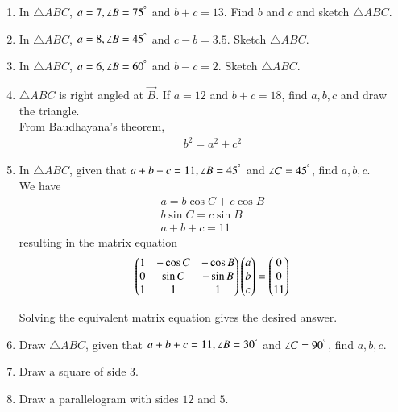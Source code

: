 \documentclass[journal,12pt,twocolumn]{IEEEtran}
\renewcommand\thesection{\arabic{section}}
\begin{document}
\begin{enumerate}[label=\thesection.\arabic*
,ref=\thesection.\theenumi]
\item In $\triangle ABC$,  $a = 7, \angle B = 75^{\degree}$ and $b+c = 13$. 
Find $b$ and $c$ and sketch $\triangle ABC$.
\item In $\triangle ABC$,  $a = 8, \angle B = 45^{\degree}$ and $c-b = 3.5$.
Sketch $\triangle ABC$.
\item In $\triangle ABC$,  $a = 6, \angle B = 60^{\degree}$ and $b-c = 2$. 
Sketch $\triangle ABC$.
\item $\triangle ABC$ is right angled at $\vec{B}$.  If $a = 12$ and $b+c = 18$, find $a,b,c$ and draw the 
triangle.
\\
\solution From Baudhayana's theorem, 
\begin{align}
b^2 = a^2 + c^2
\end{align}
%
\item In $\triangle ABC$,  given that $a+b+c = 11, \angle B = 45^{\degree}$ and $\angle C = 45^{\degree}$, 
find 
$a,b,c$.
\\
\solution We have
\begin{align}
a = b \cos C + c \cos B
\\
b \sin C = c \sin B
\\
a + b+c = 11
\end{align}
%
resulting  in the matrix equation 
\begin{align}
\begin{pmatrix}
1 & -\cos C & - \cos B
\\
0 & \sin C &- \sin B
\\
1 & 1 & 1
\end{pmatrix}
\begin{pmatrix}a \\b\\c\end{pmatrix} = \begin{pmatrix}0 \\ 0 \\ 11\end{pmatrix}
\end{align}

Solving the equivalent matrix equation gives the desired answer.
\item Draw $\triangle ABC$,  given that $a+b+c = 11, \angle B = 30^{\degree}$ and $\angle C = 90^{\degree}$, 
find 
$a,b,c$.
\item Draw a square of side $3$.
\item Draw a parallelogram with sides $12$ and $5$.


\end{enumerate}
\end{document}
